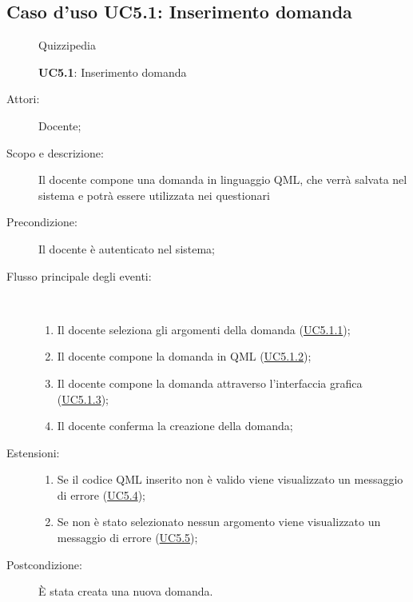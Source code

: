 \subsection{Caso d'uso UC5.1: Inserimento domanda}
	\begin{figure}[H]
		\centering
		\begin{resizedtikzpicture}{\textwidth}
		\begin{umlsystem}[x=0, fill=lightgray!20]{Quizzipedia}
		\end{umlsystem}
		\end{resizedtikzpicture}
		\caption{\textbf{UC5.1}: Inserimento domanda}
		\label{UC5.1}
	\end{figure}
\begin{description}
\item[Attori:] Docente;
\item[Scopo e descrizione:] Il docente compone una domanda in linguaggio QML, che verrà salvata nel sistema e potrà essere utilizzata nei questionari
      \item[Precondizione:] Il docente è autenticato nel sistema;

        \item[Flusso principale degli eventi:] \ 
 \begin{enumerate}
          \item Il docente seleziona gli argomenti della domanda (\hyperlink{UC5.1.1}{UC5.1.1});
          \item Il docente compone la domanda in QML  (\hyperlink{UC5.1.2}{UC5.1.2});
          \item Il docente compone la domanda attraverso l'interfaccia grafica (\hyperlink{UC5.1.3}{UC5.1.3});
          \item Il docente conferma la creazione della domanda;

      \end{enumerate}
    \item[Estensioni:]
      \begin{enumerate}
          \item Se il codice QML inserito non è valido viene visualizzato un messaggio di errore (\hyperlink{UC5.4}{UC5.4});
          \item Se non è stato selezionato nessun argomento viene visualizzato un messaggio di errore (\hyperlink{UC5.5}{UC5.5});

      \end{enumerate}
    \item[Postcondizione:] È stata creata una nuova domanda.
  \end{description}
\hypertarget{UC5.1.1}{}
